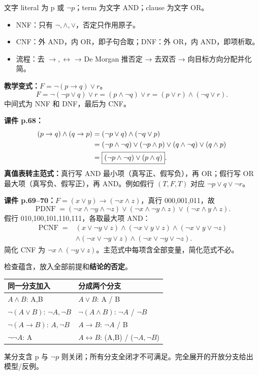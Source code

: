 文字 literal 为 p 或 $\neg p$；term 为文字 AND；clause 为文字 OR。
\begin{itemize}
\item NNF：只有 $\neg,\land,\lor$，否定只作用原子。
\item CNF：外 AND，内 OR，即子句合取；DNF：外 OR，内 AND，即项析取。
\item 流程：去 $\to,\leftrightarrow$ → De Morgan 推否定 → 去双否 → 向目标方向分配并化简。
\end{itemize}
\textbf{教学变式：}$F=\neg(p\to q)\lor r$。
\[
F=\neg(\neg p\lor q)\lor r=(p\land\neg q)\lor r
=(p\lor r)\land(\neg q\lor r).
\]
中间式为 NNF 和 DNF，最后为 CNF。

\textbf{课件 p.68：}
\[
\begin{aligned}
(p\to q)\land(q\to p)
&=(\neg p\lor q)\land(\neg q\lor p)\\
&=(\neg p\land\neg q)\lor(\neg p\land p)\lor(q\land\neg q)\lor(q\land p)\\
&=\boxed{(\neg p\land\neg q)\lor(p\land q)}.
\end{aligned}
\]
\textbf{真值表转主范式：}真行写 AND 最小项（真写正、假写负），再 OR；假行写 OR 最大项（真写负、假写正），再 AND。例如假行 $(T,F,T)$ 对应 $\neg p\lor q\lor\neg r$。

\textbf{课件 p.69--70：}$F=(x\lor y)\to(\neg x\land z)$，真行 000,001,011，故
\[
\operatorname{PDNF}=(\neg x\land\neg y\land\neg z)\lor(\neg x\land\neg y\land z)\lor(\neg x\land y\land z).
\]
假行 010,100,101,110,111，各取最大项 AND：
\[
\begin{aligned}
\operatorname{PCNF}={}&(x\lor\neg y\lor z)\land(\neg x\lor y\lor z)\land(\neg x\lor y\lor\neg z)\\
&\land(\neg x\lor\neg y\lor z)\land(\neg x\lor\neg y\lor\neg z).
\end{aligned}
\]
简化 CNF 为 $\neg x\land(\neg y\lor z)$。主范式中每项含全部变量，简化范式不必。

检查蕴含，放入全部前提和\textbf{结论的否定}。
\begin{center}\begin{tabular}{l|l}\toprule
同一分支加入&分成两个分支\\\midrule
$A\land B$: A,B&$A\lor B$: A / B\\
$\neg(A\lor B)$: $\neg A,\neg B$&$\neg(A\land B)$: $\neg A$ / $\neg B$\\
$\neg(A\to B)$: $A,\neg B$&$A\to B$: $\neg A$ / B\\
$\neg\neg A$: A&$A\leftrightarrow B$: (A,B) / ($\neg A,\neg B$)\\\bottomrule
\end{tabular}\end{center}
某分支含 p 与 $\neg p$ 则关闭；所有分支全闭才不可满足。完全展开的开放分支给出模型/反例。

